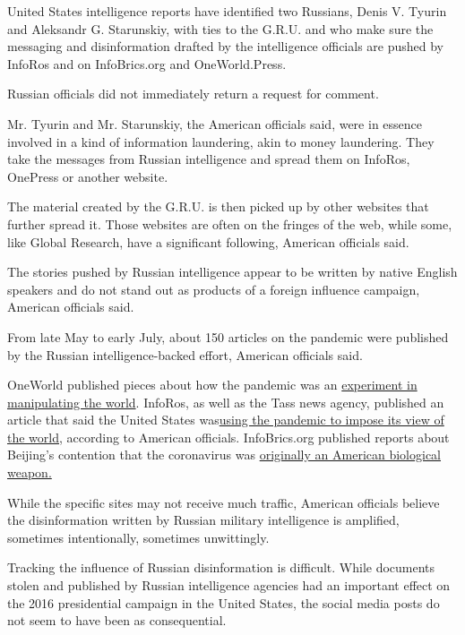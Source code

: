 United States intelligence reports have identified two Russians, Denis
V. Tyurin and Aleksandr G. Starunskiy, with ties to the G.R.U. and who
make sure the messaging and disinformation drafted by the intelligence
officials are pushed by InfoRos and on InfoBrics.org and OneWorld.Press.

Russian officials did not immediately return a request for comment.

Mr. Tyurin and Mr. Starunskiy, the American officials said, were in
essence involved in a kind of information laundering, akin to money
laundering. They take the messages from Russian intelligence and spread
them on InfoRos, OnePress or another website.

The material created by the G.R.U. is then picked up by other websites
that further spread it. Those websites are often on the fringes of the
web, while some, like Global Research, have a significant following,
American officials said.

The stories pushed by Russian intelligence appear to be written by
native English speakers and do not stand out as products of a foreign
influence campaign, American officials said.

From late May to early July, about 150 articles on the pandemic were
published by the Russian intelligence-backed effort, American officials
said.

OneWorld published pieces about how the pandemic was an
\href{https://oneworld.press/?module=articles\&action=view\&id=1521}{experiment
in manipulating the world}. InfoRos, as well as the Tass news agency,
published an article that said the United States
was\href{http://inforos.ru/en/?module=news\&action=view\&id=108952}{using
the pandemic to impose its view of the world}, according to American
officials. InfoBrics.org published reports about Beijing's contention
that the coronavirus was
\href{http://infobrics.org/post/30541/}{originally an American
biological weapon.}

While the specific sites may not receive much traffic, American
officials believe the disinformation written by Russian military
intelligence is amplified, sometimes intentionally, sometimes
unwittingly.

Tracking the influence of Russian disinformation is difficult. While
documents stolen and published by Russian intelligence agencies had an
important effect on the 2016 presidential campaign in the United States,
the social media posts do not seem to have been as consequential.

